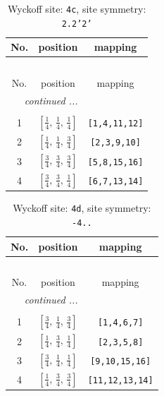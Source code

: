\documentclass[fleqn,8pt]{jsarticle}
\begin{document}
\renewcommand{\arraystretch}{1.2}
\begin{longtable}{ccc}
\caption{Wyckoff site: {\tt 4c}, site symmetry: {\tt 2.2'2'}}
 \\
 \hline \hline
No. & position & mapping \\ \hline \endfirsthead

\multicolumn{2}{l}{\tablename\ \thetable{}} \\
 \hline \hline
No. & position & mapping \\ \hline \endhead

 \hline \hline
\multicolumn{2}{r}{\footnotesize\it continued ...} \\ \endfoot

 \hline \hline
\multicolumn{2}{r}{} \\ \endlastfoot

1 & $\left[ \frac{1}{4},\, \frac{1}{4},\, \frac{1}{4} \right]$ & {\tt [1,4,11,12]} \\ \hline
2 & $\left[ \frac{1}{4},\, \frac{1}{4},\, \frac{3}{4} \right]$ & {\tt [2,3,9,10]} \\ \hline
3 & $\left[ \frac{3}{4},\, \frac{3}{4},\, \frac{3}{4} \right]$ & {\tt [5,8,15,16]} \\ \hline
4 & $\left[ \frac{3}{4},\, \frac{3}{4},\, \frac{1}{4} \right]$ & {\tt [6,7,13,14]} \\
\end{longtable}
\renewcommand{\arraystretch}{1.2}
\begin{longtable}{ccc}
\caption{Wyckoff site: {\tt 4d}, site symmetry: {\tt -4..}}
 \\
 \hline \hline
No. & position & mapping \\ \hline \endfirsthead

\multicolumn{2}{l}{\tablename\ \thetable{}} \\
 \hline \hline
No. & position & mapping \\ \hline \endhead

 \hline \hline
\multicolumn{2}{r}{\footnotesize\it continued ...} \\ \endfoot

 \hline \hline
\multicolumn{2}{r}{} \\ \endlastfoot

1 & $\left[ \frac{3}{4},\, \frac{1}{4},\, \frac{3}{4} \right]$ & {\tt [1,4,6,7]} \\ \hline
2 & $\left[ \frac{1}{4},\, \frac{3}{4},\, \frac{1}{4} \right]$ & {\tt [2,3,5,8]} \\ \hline
3 & $\left[ \frac{3}{4},\, \frac{1}{4},\, \frac{1}{4} \right]$ & {\tt [9,10,15,16]} \\ \hline
4 & $\left[ \frac{1}{4},\, \frac{3}{4},\, \frac{3}{4} \right]$ & {\tt [11,12,13,14]} \\
\end{longtable}
\end{document}
